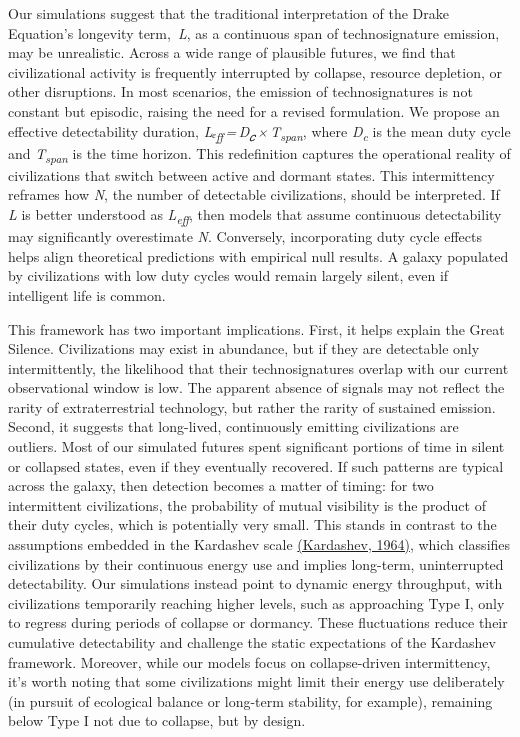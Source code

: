 Our simulations suggest that the traditional interpretation of the Drake Equation's longevity term,\, \emph{L}, as a continuous span of technosignature emission, may be unrealistic. Across a wide range of plausible futures, we find that civilizational activity is frequently interrupted by collapse, resource depletion, or other disruptions. In most scenarios, the emission of technosignatures is not constant but episodic, raising the need for a revised formulation. We propose an effective detectability duration, \emph{Lₑ\textsubscript{ff}\,=\,D\textsubscript{𝑐\,}×\,T\textsubscript{span}}, where \emph{D\textsubscript{c}} is the mean duty cycle and \emph{T\textsubscript{span}} is the time horizon. This redefinition captures the operational reality of civilizations that switch between active and dormant states. This intermittency reframes how \emph{N}, the number of detectable civilizations, should be interpreted. If \emph{L} is better understood as \emph{L\textsubscript{eff}}, then models that assume continuous detectability may significantly overestimate \emph{N}. Conversely, incorporating duty cycle effects helps align theoretical predictions with empirical null results. A galaxy populated by civilizations with low duty cycles would remain largely silent, even if intelligent life is common.

This framework has two important implications. First, it helps explain the Great Silence. Civilizations may exist in abundance, but if they are detectable only intermittently, the likelihood that their technosignatures overlap with our current observational window is low. The apparent absence of signals may not reflect the rarity of extraterrestrial technology, but rather the rarity of sustained emission. Second, it suggests that long-lived, continuously emitting civilizations are outliers. Most of our simulated futures spent significant portions of time in silent or collapsed states, even if they eventually recovered. If such patterns are typical across the galaxy, then detection becomes a matter of timing: for two intermittent civilizations, the probability of mutual visibility is the product of their duty cycles, which is potentially very small. This stands in contrast to the assumptions embedded in the Kardashev scale \href{https://paperpile.com/c/hQuIW4/6tyN}{(Kardashev, 1964)}, which classifies civilizations by their continuous energy use and implies long-term, uninterrupted detectability. Our simulations instead point to dynamic energy throughput, with civilizations temporarily reaching higher levels, such as approaching Type I, only to regress during periods of collapse or dormancy. These fluctuations reduce their cumulative detectability and challenge the static expectations of the Kardashev framework. Moreover, while our models focus on collapse-driven intermittency, it's worth noting that some civilizations might limit their energy use deliberately (in pursuit of ecological balance or long-term stability, for example), remaining below Type I not due to collapse, but by design.

